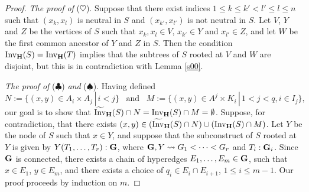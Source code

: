 \documentclass{article}
\theoremstyle{plain}
\theoremstyle{definition}
\newcommand{\Invt}{\widetilde{\mathrm{Inv}}}
\newcommand{\Inv}{{\mathrm{Inv}}}
\begin{document}
\begin{proof}
{\em The proof of} ($\heartsuit$). Suppose that there exist indices $1\leq k\leq k'<l'\leq l\leq n$ such that $(x_k,x_l)$ is neutral in $S$ and $(x_{k'},x_{l'})$ is not neutral in $S$. Let $V$, $Y$ and $Z$ be the vertices of $S$ such that $x_k,x_l\in V$, $x_{k'}\in Y$ and $x_{l'}\in Z$, and let $W$ be the first common ancestor of $Y$ and $Z$ in $S$. Then the condition $\Inv_{\bf H}(S)= \Inv_{\bf H}(T)$ implies that the subtrees of $S$ rooted at $V$ and $W$ are disjoint, but this is in contradiction with Lemma \ref{s00}.

\smallskip 
{\em The proof of} ($\clubsuit$) {\em and} ($\spadesuit$). Having defined $$N:=\{(x,y)\in A_i\times A_j\,|\, i<j\}\enspace \mbox{ and } \enspace M:=\{(x,y)\in A^j\times K_i\,|\, 1<j<q, i\in I_j\},$$ our goal is to show that $\Invt_{\bf H}(S)\cap N=\Inv_{\bf H}(S)\cap M=\emptyset$. Suppose, for contradiction, that there exists $(x,y)\in (\Invt_{\bf H}(S)\cap N)\cup (\Inv_{\bf H}(S)\cap M)$. Let $Y$ be the node of $S$ such that $x\in Y$, and suppose that the subconstruct of $S$ rooted at $Y$ is given by $Y(T_1,\dots,T_r):{\bf G}$, where ${\bf G},Y\leadsto G_1<\cdots <G_r$ and $T_i:{\bf G}_i$. Since ${\bf G}$ is connected, there exists a chain of hyperedges $E_1,\dots,E_m\in{\bf G}$, such that $x\in E_1$, $y\in E_m$, and there exists a choice of $q_i\in E_i\cap E_{i+1}$, $1\leq i\leq m-1$. Our proof proceeds by induction on $m$.

\smallskip


\end{proof}
\end{document}

